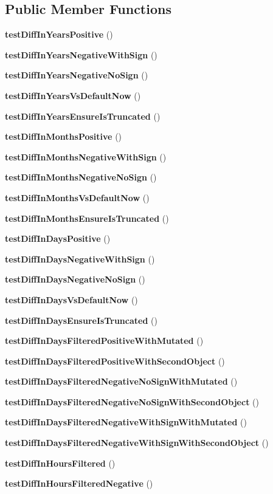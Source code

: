 \subsection*{Public Member Functions}
\begin{DoxyCompactItemize}
\item 
{\bf test\+Diff\+In\+Years\+Positive} ()
\item 
{\bf test\+Diff\+In\+Years\+Negative\+With\+Sign} ()
\item 
{\bf test\+Diff\+In\+Years\+Negative\+No\+Sign} ()
\item 
{\bf test\+Diff\+In\+Years\+Vs\+Default\+Now} ()
\item 
{\bf test\+Diff\+In\+Years\+Ensure\+Is\+Truncated} ()
\item 
{\bf test\+Diff\+In\+Months\+Positive} ()
\item 
{\bf test\+Diff\+In\+Months\+Negative\+With\+Sign} ()
\item 
{\bf test\+Diff\+In\+Months\+Negative\+No\+Sign} ()
\item 
{\bf test\+Diff\+In\+Months\+Vs\+Default\+Now} ()
\item 
{\bf test\+Diff\+In\+Months\+Ensure\+Is\+Truncated} ()
\item 
{\bf test\+Diff\+In\+Days\+Positive} ()
\item 
{\bf test\+Diff\+In\+Days\+Negative\+With\+Sign} ()
\item 
{\bf test\+Diff\+In\+Days\+Negative\+No\+Sign} ()
\item 
{\bf test\+Diff\+In\+Days\+Vs\+Default\+Now} ()
\item 
{\bf test\+Diff\+In\+Days\+Ensure\+Is\+Truncated} ()
\item 
{\bf test\+Diff\+In\+Days\+Filtered\+Positive\+With\+Mutated} ()
\item 
{\bf test\+Diff\+In\+Days\+Filtered\+Positive\+With\+Second\+Object} ()
\item 
{\bf test\+Diff\+In\+Days\+Filtered\+Negative\+No\+Sign\+With\+Mutated} ()
\item 
{\bf test\+Diff\+In\+Days\+Filtered\+Negative\+No\+Sign\+With\+Second\+Object} ()
\item 
{\bf test\+Diff\+In\+Days\+Filtered\+Negative\+With\+Sign\+With\+Mutated} ()
\item 
{\bf test\+Diff\+In\+Days\+Filtered\+Negative\+With\+Sign\+With\+Second\+Object} ()
\item 
{\bf test\+Diff\+In\+Hours\+Filtered} ()
\item 
{\bf test\+Diff\+In\+Hours\+Filtered\+Negative} ()

\end{DoxyCompactItemize}
